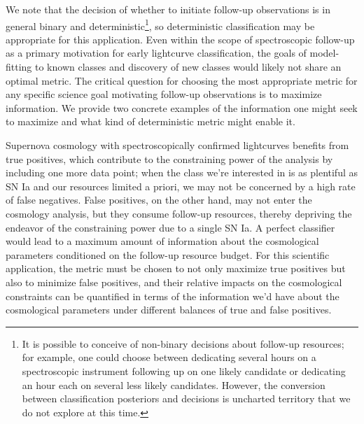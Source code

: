 We note that the decision of whether to initiate follow-up observations is in general binary and deterministic\footnote{It is possible to conceive of non-binary decisions about follow-up resources; for example, one could choose between dedicating several hours on a spectroscopic instrument following up on one likely candidate or dedicating an hour each on several less likely candidates.  However, the conversion between classification posteriors and decisions is uncharted territory that we do not explore at this time.}, so deterministic classification may be appropriate for this application.
Even within the scope of spectroscopic follow-up as a primary motivation for early lightcurve classification, the goals of model-fitting to known classes and discovery of new classes would likely not share an optimal metric.
The critical question for choosing the most appropriate metric for any specific science goal motivating follow-up observations is to maximize information.
We provide two concrete examples of the information one might seek to maximize and what kind of deterministic metric might enable it.

Supernova cosmology with spectroscopically confirmed lightcurves benefits from true positives, which contribute to the constraining power of the analysis by including one more data point; when the class we're interested in is as plentiful as SN Ia and our resources limited a priori, we may not be concerned by a high rate of false negatives.
False positives, on the other hand, may not enter the cosmology analysis, but they consume follow-up resources, thereby depriving the endeavor of the constraining power due to a single SN Ia.
A perfect classifier would lead to a maximum amount of information about the cosmological parameters conditioned on the follow-up resource budget.
For this scientific application, the metric must be chosen to not only maximize true positives but also to minimize false positives, and their relative impacts on the cosmological constraints can be quantified in terms of the information we'd have about the cosmological parameters under different balances of true and false positives.


